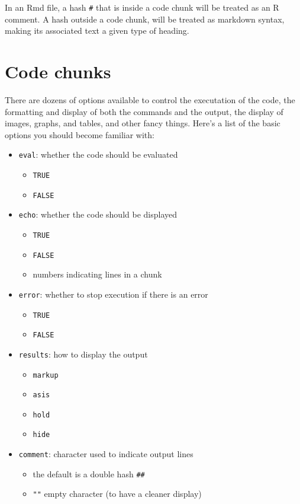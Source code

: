 \documentclass[
]{book}
\providecommand{\tightlist}{%
  \setlength{\itemsep}{0pt}\setlength{\parskip}{0pt}}
\begin{document}
In an Rmd file, a hash \texttt{\#} that is inside a code chunk will be treated as
an R comment. A hash outside a code chunk, will be treated as markdown syntax,
making its associated text a given type of heading.

\hypertarget{code-chunks}{%
\section{Code chunks}\label{code-chunks}}

There are dozens of options available to control the executation of the code,
the formatting and display of both the commands and the output, the display
of images, graphs, and tables, and other fancy things. Here's a list of the
basic options you should become familiar with:

\begin{itemize}
\tightlist
\item
  \texttt{eval}: whether the code should be evaluated

  \begin{itemize}
  \tightlist
  \item
    \texttt{TRUE}
  \item
    \texttt{FALSE}
  \end{itemize}
\item
  \texttt{echo}: whether the code should be displayed

  \begin{itemize}
  \tightlist
  \item
    \texttt{TRUE}
  \item
    \texttt{FALSE}
  \item
    numbers indicating lines in a chunk
  \end{itemize}
\item
  \texttt{error}: whether to stop execution if there is an error

  \begin{itemize}
  \tightlist
  \item
    \texttt{TRUE}
  \item
    \texttt{FALSE}
  \end{itemize}
\item
  \texttt{results}: how to display the output

  \begin{itemize}
  \tightlist
  \item
    \texttt{markup}
  \item
    \texttt{asis}
  \item
    \texttt{hold}
  \item
    \texttt{hide}
  \end{itemize}
\item
  \texttt{comment}: character used to indicate output lines

  \begin{itemize}
  \tightlist
  \item
    the default is a double hash \texttt{\#\#}
  \item
    \texttt{""} empty character (to have a cleaner display)
  \end{itemize}
\end{itemize}
\end{document}
